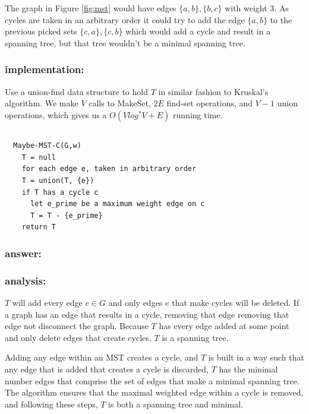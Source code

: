 \documentclass[titlepage]{article}
\theoremstyle{definition}
\begin{document}
    The graph in Figure \ref{fig:mst} would have edges $\{a,b\}, \{b,c\}$ with
    weight 3. As cycles are taken in an arbitrary order it could try to add the
    edge $\{a,b\}$  to the previous picked sets $\{c,a\}, \{c,b\}$ which would add
    a cycle and result in a spanning tree, but that tree wouldn't be a minimal
    spanning tree. 

    \subsubsection{implementation:}
      Use a union-find data structure to hold $T$ in similar fashion to Kruskal's
      algorithm. We make $V$ calls to MakeSet, $2E$ find-set operations, and
      $V-1$ union operations, which gives us a $O(V log^* V + E)$ running time. 


\subsection{}
  \begin{lstlisting}
  Maybe-MST-C(G,w)
    T = null
    for each edge e, taken in arbitrary order
    T = union(T, {e})
    if T has a cycle c
      let e_prime be a maximum weight edge on c
      T = T - {e_prime}
    return T
  \end{lstlisting}

  \subsubsection{answer:}
  \subsubsection{analysis:}
    $T$ will add every edge $e \in G$ and only edges $e$ that make cycles will
    be deleted. If a graph has an edge that results in a cycle, removing that
    edge removing that edge not disconnect the graph. Because $T$ has every
    edge added at some point and only delete edges that create cycles, $T$ is a
    spanning tree. 

    Adding any  edge within an MST creates a cycle, and $T$ is built in a way
    such that any edge that is added that creates a cycle is discarded, $T$ has
    the minimal number edges that comprise the set of edges that make a minimal
    spanning tree. The algorithm ensures that the maximal weighted edge within
    a cycle is removed, and following these steps, $T$ is both a spanning tree
    and minimal. 
\end{document}
